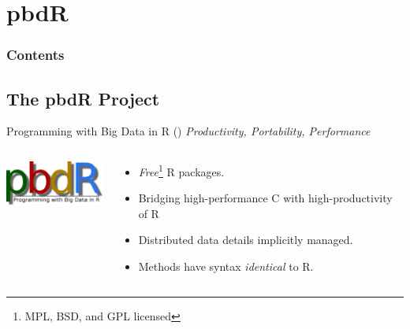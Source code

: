 \section{pbdR}

\hidenum
\begin{frame}[noframenumbering]
\frametitle{Contents}
\end{frame}
\shownum


\subsection{The pbdR Project}


\begin{frame}
  \begin{block}{Programming with Big Data in R (\pbdR)}
    \centering \emph{Productivity, Portability, Performance}\\[.4cm]
    \begin{columns}[onlytextwidth]
      \begin{column}{0.30\textwidth}
        \centering
        \includegraphics[width=3.4cm]{../common/pics/logos/newpbdr}\\[.2cm]
      \end{column}
      \begin{column}{0.65\textwidth}
        \begin{itemize}
        \item \emph{Free}\footnote{MPL, BSD, and GPL licensed} R packages.
        \item Bridging high-performance C with high-productivity of R
        \item Distributed data details implicitly managed.
        \item Methods have syntax \emph{identical} to R.
        \end{itemize}
      \end{column}
    \end{columns}
  \end{block}
\end{frame}

